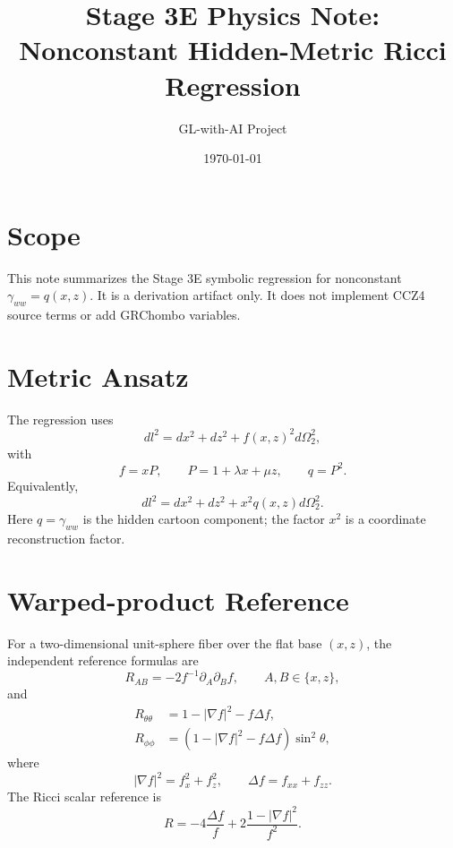 \documentclass[11pt]{article}
\title{Stage 3E Physics Note: Nonconstant Hidden-Metric Ricci Regression}
\author{GL-with-AI Project}
\date{\today}
\begin{document}
\maketitle

\section{Scope}

This note summarizes the Stage 3E symbolic regression for nonconstant
\(\gamma_{ww}=q(x,z)\). It is a derivation artifact only. It does not implement
CCZ4 source terms or add GRChombo variables.

\section{Metric Ansatz}

The regression uses
\begin{equation}
  dl^2 = dx^2 + dz^2 + f(x,z)^2 d\Omega_2^2,
\end{equation}
with
\begin{equation}
  f=xP,\qquad
  P=1+\lambda x+\mu z,\qquad
  q=P^2.
\end{equation}
Equivalently,
\begin{equation}
  dl^2 = dx^2 + dz^2 + x^2q(x,z)d\Omega_2^2.
\end{equation}
Here \(q=\gamma_{ww}\) is the hidden cartoon component; the factor \(x^2\) is a
coordinate reconstruction factor.

\section{Warped-product Reference}

For a two-dimensional unit-sphere fiber over the flat base \((x,z)\), the
independent reference formulas are
\begin{equation}
  R_{AB}=-2f^{-1}\partial_A\partial_B f,
  \qquad A,B\in\{x,z\},
\end{equation}
and
\begin{align}
  R_{\theta\theta}
  &=
  1-|\nabla f|^2-f\Delta f,\\
  R_{\phi\phi}
  &=
  \left(1-|\nabla f|^2-f\Delta f\right)\sin^2\theta,
\end{align}
where
\begin{equation}
  |\nabla f|^2=f_x^2+f_z^2,
  \qquad
  \Delta f=f_{xx}+f_{zz}.
\end{equation}
The Ricci scalar reference is
\begin{equation}
  R=-4\frac{\Delta f}{f}
  +2\frac{1-|\nabla f|^2}{f^2}.
\end{equation}
\end{document}

